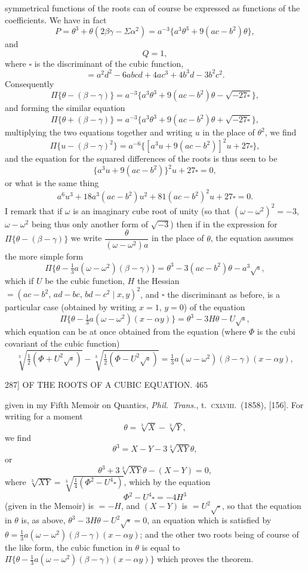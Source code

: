 \documentclass[11pt]{article}
\begin{document}
symmetrical functions of the roots can of course be expressed as functions of the
coefficients. We have in fact
\[ P=\theta^{3}+\theta(2\beta\gamma-\Sigma\alpha^{2})=a^{-3}\{a^{3}\theta^{3}+9(ac-b^{2})\theta\}, \]
and
\[ Q=1, \]
where $\square$ is the discriminant of the cubic function,
\[ =a^{2}d^{2}-6abcd+4ac^{3}+4b^{3}d-3b^{2}c^{2}. \]
Consequently
\[ \Pi\{\theta-(\beta-\gamma)\}=a^{-3}\{a^{3}\theta^{3}+9(ac-b^{2})\theta-\sqrt{-27\square}\}, \]
and forming the similar equation
\[ \Pi\{\theta+(\beta-\gamma)\}=a^{-3}\{a^{3}\theta^{3}+9(ac-b^{2})\theta+\sqrt{-27\square}\}, \]
multiplying the two equations together and writing $u$ in the place of $\theta^{2}$, we find
\[ \Pi\{u-(\beta-\gamma)^{2}\}=a^{-6}\{[a^{3}u+9(ac-b^{2})]^{2}u+27\square\}, \]
and the equation for the squared differences of the roots is thus seen to be
\[ \{a^{3}u+9(ac-b^{2})\}^{2}u+27\square=0, \]
or what is the same thing
\[ a^{6}u^{3}+18a^{3}(ac-b^{2})u^{2}+81(ac-b^{2})^{2}u+27\square=0. \]
I remark that if $\omega$ is an imaginary cube root of unity (so that $(\omega-\omega^{2})^{2}=-3$,
$\omega-\omega^{2}$ being thus only another form of $\sqrt{-3}$) then if in the expression for
$\Pi\{\theta-(\beta-\gamma)\}$ we write $\dfrac{\theta}{(\omega-\omega^{2})a}$ in the place of $\theta$, the equation assumes the more simple form
\[ \Pi\{\theta-\tfrac{1}{3}a(\omega-\omega^{2})(\beta-\gamma)\}=\theta^{3}-3(ac-b^{2})\theta-a^{3}\sqrt{\square}, \]
which if $U$ be the cubic function, $H$ the Hessian $=(ac-b^{2},\, ad-bc,\, bd-c^{2}\mid x,y)^{2}$,
and $\square$ the discriminant as before, is a particular case (obtained by writing $x=1$, $y=0$)
of the equation
\[ \Pi\{\theta-\tfrac{1}{3}a(\omega-\omega^{2})(x-\alpha y)\}=\theta^{3}-3H\theta-U\sqrt{\square}, \]
which equation can be at once obtained from the equation (where $\Phi$ is the cubi\-
covariant of the cubic function)
\[ \sqrt[3]{\tfrac{1}{2}(\Phi+U^{2}\sqrt{\square})}-\sqrt[3]{\tfrac{1}{2}(\Phi-U^{2}\sqrt{\square})}=\tfrac{1}{3}a(\omega-\omega^{2})(\beta-\gamma)(x-\alpha y), \]

\begin{center}
\textsc{287]} \hfill OF THE ROOTS OF A CUBIC EQUATION. \hfill 465
\end{center}

given in my Fifth Memoir on Quantics, \textit{Phil.\ Trans.}, t.~\textsc{cxlviii}.\ (1858), [156]. For
writing for a moment
\[ \theta=\sqrt[3]{X}-\sqrt[3]{Y}, \]
we find
\[ \theta^{3}=X-Y-3\sqrt[3]{XY}\theta, \]
or
\[ \theta^{3}+3\sqrt[3]{XY}\theta-(X-Y)=0, \]
where $\sqrt[3]{XY}=\sqrt[3]{\tfrac{1}{4}(\Phi^{2}-U^{4}\square)}$, which by the equation
\[ \Phi^{2}-U^{4}\square=-4H^{3} \]
(given in the Memoir) is $=-H$, and $(X-Y)$ is $=U^{2}\sqrt{\square}$, so that the equation in $\theta$ is,
as above, $\theta^{3}-3H\theta-U^{2}\sqrt{\square}=0$, an equation which is satisfied by
$\theta=\tfrac{1}{3}a(\omega-\omega^{2})(\beta-\gamma)(x-\alpha y)$;
and the other two roots being of course of the like form, the cubic function in $\theta$ is
equal to $\Pi\{\theta-\tfrac{1}{3}a(\omega-\omega^{2})(\beta-\gamma)(x-\alpha y)\}$ which proves the theorem.
\end{document}
